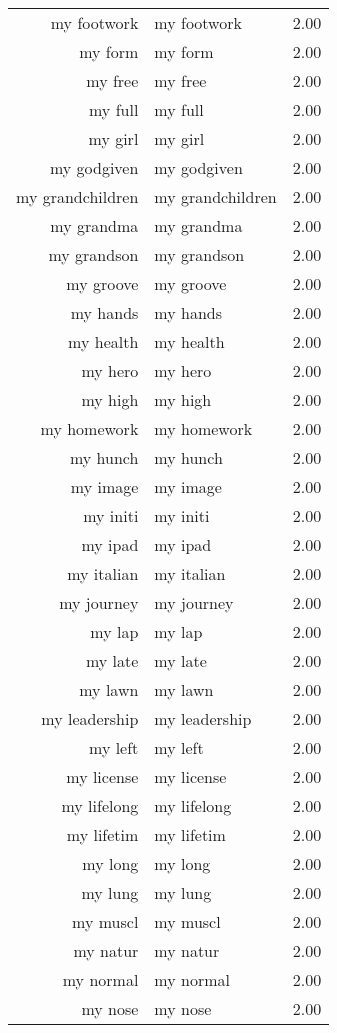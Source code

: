 \begin{table}[ht]
\begin{tabular}{rlr}
  my footwork & my footwork & 2.00 \\ 
  my form & my form & 2.00 \\ 
  my free & my free & 2.00 \\ 
  my full & my full & 2.00 \\ 
  my girl & my girl & 2.00 \\ 
  my godgiven & my godgiven & 2.00 \\ 
  my grandchildren & my grandchildren & 2.00 \\ 
  my grandma & my grandma & 2.00 \\ 
  my grandson & my grandson & 2.00 \\ 
  my groove & my groove & 2.00 \\ 
  my hands & my hands & 2.00 \\ 
  my health & my health & 2.00 \\ 
  my hero & my hero & 2.00 \\ 
  my high & my high & 2.00 \\ 
  my homework & my homework & 2.00 \\ 
  my hunch & my hunch & 2.00 \\ 
  my image & my image & 2.00 \\ 
  my initi & my initi & 2.00 \\ 
  my ipad & my ipad & 2.00 \\ 
  my italian & my italian & 2.00 \\ 
  my journey & my journey & 2.00 \\ 
  my lap & my lap & 2.00 \\ 
  my late & my late & 2.00 \\ 
  my lawn & my lawn & 2.00 \\ 
  my leadership & my leadership & 2.00 \\ 
  my left & my left & 2.00 \\ 
  my license & my license & 2.00 \\ 
  my lifelong & my lifelong & 2.00 \\ 
  my lifetim & my lifetim & 2.00 \\ 
  my long & my long & 2.00 \\ 
  my lung & my lung & 2.00 \\ 
  my muscl & my muscl & 2.00 \\ 
  my natur & my natur & 2.00 \\ 
  my normal & my normal & 2.00 \\ 
  my nose & my nose & 2.00 \\ 

\end{tabular}
\end{table}
